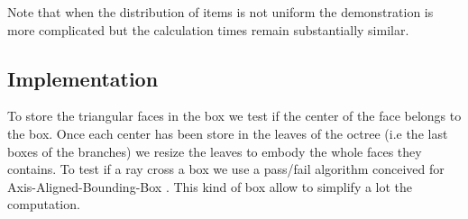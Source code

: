 \documentclass[AMA,STIX1COL]{WileyNJD-v2}
\begin{document}
Note that when the distribution of items is not uniform the demonstration is more complicated but the calculation times remain substantially similar.

\subsection{Implementation}


To store the triangular faces in the box we test if the center of the face belongs to the box. Once each center has been store in the leaves of the octree (i.e the last boxes of the branches) we resize the leaves to embody the whole faces they contains. To test if a ray cross a box we use a pass/fail algorithm conceived for Axis-Aligned-Bounding-Box \cite{AABB}. This kind of box allow to simplify a lot the computation. 
\end{document}
